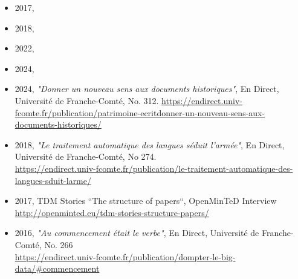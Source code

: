 \begin{itemize}
\item 2017, %
\item 2018, %
\item 2022, %
\item 2024, 
\end{itemize}



\vspace{3mm}



\vspace{3mm}

{\textsc{}}

\begin{itemize}
\item 2024, \textit{"Donner un nouveau sens aux documents historiques"}, En Direct, Université de Franche-Comté, No. 312. \url{https://endirect.univ-fcomte.fr/publication/patrimoine-ecritdonner-un-nouveau-sens-aux-documents-historiques/}
\item 2018, \textit{"Le traitement automatique des langues séduit l'armée"}, En Direct, Université de Franche-Comté, No 274. \\ \url{https://endirect.univ-fcomte.fr/publication/le-traitement-automatique-des-langues-sduit-larme/}
\item 2017, TDM Stories “The structure of papers“, OpenMinTeD Interview\\\url{http://openminted.eu/tdm-stories-structure-papers/}
\item 2016, \textit{"Au commencement était le verbe"}, En Direct, Université de Franche-Comté, No. 266\\ \url{https://endirect.univ-fcomte.fr/publication/dompter-le-big-data/#commencement}
\end{itemize}

